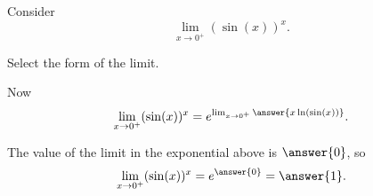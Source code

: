 \documentclass{ximera}
\author{Nela Lakos \and Kyle Parsons}
\begin{document}
\begin{exercise}

Consider
\[
\lim_{x\to0^+} (\sin(x))^x.
\]

Select the form of the limit.
\begin{multipleChoice}
\choice[correct]{$\zeroToZero$}
\choice{$\oneToInfty$}
\choice{$\inftyToZero$}
\end{multipleChoice}

Now
\[
\lim_{x\to0^+} (\sin(x))^x = e^{\lim_{x\to0^+}\answer{x \ln(\sin(x))}}.
\]

The value of the limit in the exponential above is $\answer{0}$, so
\[
\lim_{x\to0^+} (\sin(x))^x = e^{\answer{0}} = \answer{1}.
\]

\end{exercise}
\end{document}
